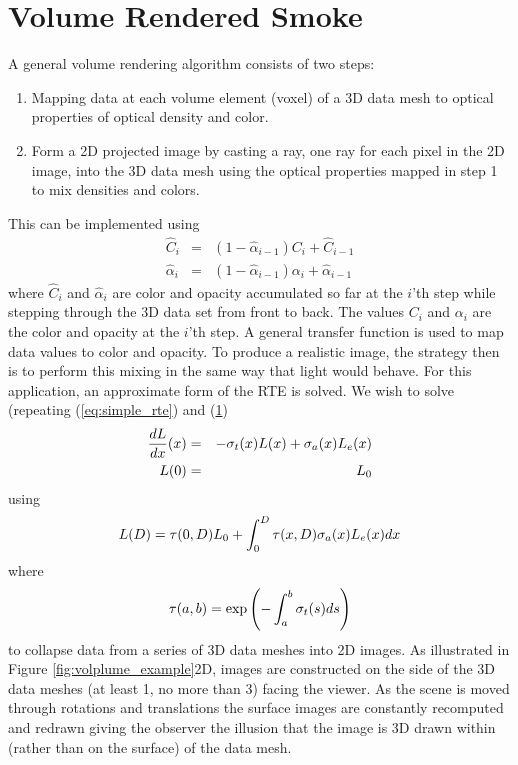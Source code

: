 %
%

\section{Volume Rendered Smoke}
A general volume rendering algorithm consists of two steps:

\begin{enumerate}
\item Mapping data at each volume element (voxel) of a 3D data
mesh to optical properties of optical density and color. \item
Form a 2D projected image by casting a ray, one ray for each pixel
in the 2D image, into the 3D data mesh using the optical
properties mapped in step 1 to mix densities and colors.
\end{enumerate}

This can be implemented \cite[Chapter 39]{gpugems} using
\begin{eqnarray*}
\hat{C}_i&=&\left(1-\hat{\alpha}_{i-1}\right)C_i + \hat{C}_{i-1}\\
\hat{\alpha}_i&=&\left(1-\hat{\alpha}_{i-1}\right)\alpha_i+\hat{\alpha}_{i-1}
\end{eqnarray*}
where $\hat{C}_i$ and $\hat{\alpha}_i$ are color and opacity
accumulated so far at the $i$'th step while stepping through the
3D data set from front to back.  The values $C_i$ and $\alpha_i$
are the color and opacity at the $i$'th step.  A general transfer
function is used to map data values to color and opacity. To
produce a realistic image, the strategy then is to perform this
mixing in the same way that light would behave.  For this
application, an approximate form of the RTE is solved.  We wish to
solve (repeating (\ref{eq:simple_rte}) and (\ref{})
\begin{eqnarray}
\label{eq:simple_rtee}
\frac{dL}{dx}(x)&=&-\sigma_t(x) L(x) + \sigma_a(x) L_e(x)\\
 L(0)&=&L_0\nonumber
\end{eqnarray}
using
\begin{equation}
\label{eq:rtesoln}
 L(D)=\tau(0,D)L_0 + \int_0^D\tau(x,D)\sigma_a(x)L_e(x) dx
\end{equation}
where
\begin{equation}
\label{eq:optdepth}
\tau(a,b)=\exp\left({-\int_a^b \sigma_t(s) ds}\right)
\end{equation}
to collapse data from a series of 3D data meshes into 2D images.
As illustrated in Figure \ref{fig:volplume_example}2D, images are constructed on the side of the 3D data meshes (at
least 1, no more than 3) facing the viewer.  As the scene is moved
through rotations and translations the surface images are
constantly recomputed and redrawn giving the observer the illusion
that the image is 3D drawn within (rather than on the surface) of
the data mesh.

